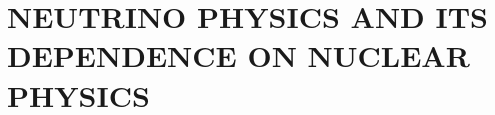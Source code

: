 %
%
%
%
%
%
%
%


%
%

\chapter{NEUTRINO PHYSICS AND ITS DEPENDENCE ON NUCLEAR PHYSICS}
\label{chap:0vbb}

